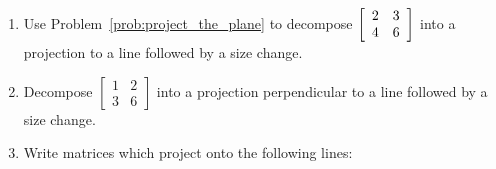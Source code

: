 \documentclass[../gatm.tex]{subfiles}
\begin{document}
\begin{enumerate}
\item Use Problem~\ref{prob:project_the_plane} to decompose $\left[\begin{array}{cc} 2 & 3 \\ 4 & 6 \end{array}\right]$ into a projection to a line followed by a size change.
\item Decompose $\left[\begin{array}{cc} 1 & 2 \\ 3 & 6\end{array}\right]$ into a projection perpendicular to a line followed by a size change.
\item Write matrices which project onto the following lines:
\begin{enumerate}
\end{enumerate}
\end{enumerate}
\end{document}
